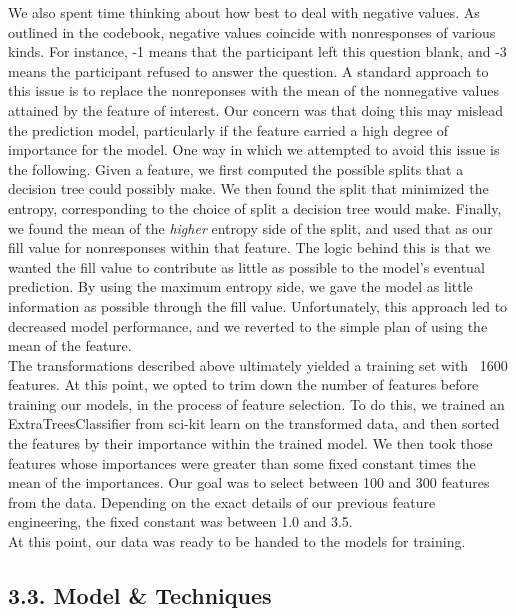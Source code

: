 We also spent time thinking about how best to deal with negative values. As outlined in the codebook, negative values coincide with nonresponses of various kinds. For instance, -1 means that the participant left this question blank, and -3 means the participant refused to answer the question. A standard approach to this issue is to replace the nonreponses with the mean of the nonnegative values attained by the feature of interest. Our concern was that doing this may mislead the prediction model, particularly if the feature carried a high degree of importance for the model. One way in which we attempted to avoid this issue is the following. Given a feature, we first computed the possible splits that a decision tree could possibly make. We then found the split that minimized the entropy, corresponding to the choice of split a decision tree would make. Finally, we found the mean of the \textit{higher} entropy side of the split, and used that as our fill value for nonresponses within that feature. The logic behind this is that we wanted the fill value to contribute as little as possible to the model's eventual prediction. By using the maximum entropy side, we gave the model as little information as possible through the fill value. Unfortunately, this approach led to decreased model performance, and we reverted to the simple plan of using the mean of the feature.\\

The transformations described above ultimately yielded a training set with ~1600 features. At this point, we opted to trim down the number of features before training our models, in the process of feature selection. To do this, we trained an ExtraTreesClassifier from sci-kit learn on the transformed data, and then sorted the features by their importance within the trained model. We then took those features whose importances were greater than some fixed constant times the mean of the importances. Our goal was to select between 100 and 300 features from the data. Depending on the exact details of our previous feature engineering, the fixed constant was between 1.0 and 3.5.\\

At this point, our data was ready to be handed to the models for training.

\newpage

\subsection*{3.3. Model \& Techniques}
